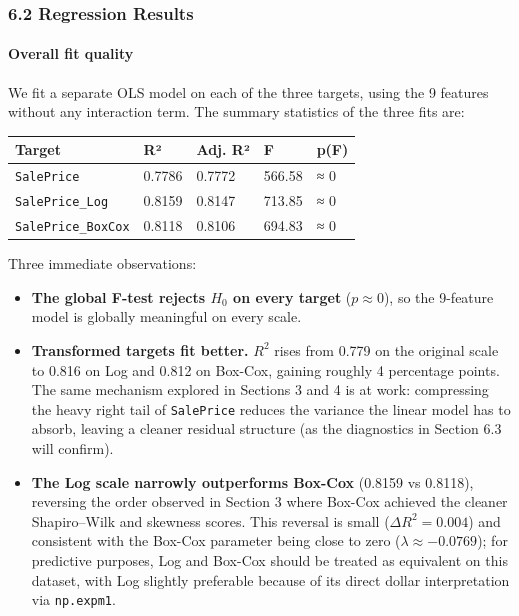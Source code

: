 \subsubsection{6.2 Regression Results}\label{regression-results}

\paragraph{Overall fit quality}\label{overall-fit-quality}

We fit a separate OLS model on each of the three targets, using the 9
features without any interaction term. The summary statistics of the
three fits are:

\begin{longtable}[]{@{}lllll@{}}
\toprule\noalign{}
Target & R² & Adj. R² & F & p(F) \\
\midrule\noalign{}
\endhead
\bottomrule\noalign{}
\endlastfoot
\texttt{SalePrice} & 0.7786 & 0.7772 & 566.58 & ≈ 0 \\
\texttt{SalePrice\_Log} & 0.8159 & 0.8147 & 713.85 & ≈ 0 \\
\texttt{SalePrice\_BoxCox} & 0.8118 & 0.8106 & 694.83 & ≈ 0 \\
\end{longtable}

Three immediate observations:

\begin{itemize}
\tightlist
\item
  \textbf{The global F-test rejects \(H_0\) on every target}
  (\(p \approx 0\)), so the 9-feature model is globally meaningful on
  every scale.
\item
  \textbf{Transformed targets fit better.} \(R^2\) rises from 0.779 on
  the original scale to 0.816 on Log and 0.812 on Box-Cox, gaining
  roughly 4 percentage points. The same mechanism explored in Sections 3
  and 4 is at work: compressing the heavy right tail of
  \texttt{SalePrice} reduces the variance the linear model has to
  absorb, leaving a cleaner residual structure (as the diagnostics in
  Section 6.3 will confirm).
\item
  \textbf{The Log scale narrowly outperforms Box-Cox} (0.8159 vs
  0.8118), reversing the order observed in Section 3 where Box-Cox
  achieved the cleaner Shapiro--Wilk and skewness scores. This reversal
  is small (\(\Delta R^2 = 0.004\)) and consistent with the Box-Cox
  parameter being close to zero (\(\lambda \approx -0.0769\)); for
  predictive purposes, Log and Box-Cox should be treated as equivalent
  on this dataset, with Log slightly preferable because of its direct
  dollar interpretation via \texttt{np.expm1}.
\end{itemize}

